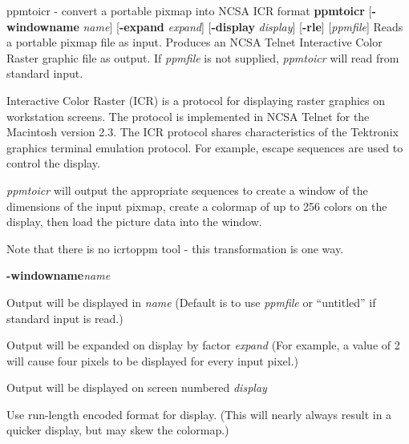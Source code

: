 %

\newpage
%

ppmtoicr - convert a portable pixmap into NCSA ICR format 
{\bf ppmtoicr}
{\rm [}{\bf -windowname}
{\it name}{\rm ]}
{\rm [}{\bf -expand}
{\it expand}{\rm ]}
{\rm [}{\bf -display}
{\it display}{\rm ]}
{\rm [}{\bf -rle}{\rm ]}
{\rm [}{\it ppmfile}{\rm ]}
Reads a portable pixmap file as input.
Produces an NCSA Telnet Interactive Color Raster graphic file as output.
If
{\it ppmfile}
is not supplied, 
{\it ppmtoicr}
will read from standard input.
\par
Interactive Color Raster (ICR) is a protocol for displaying raster
graphics on workstation screens. The protocol is implemented in NCSA
Telnet for the Macintosh version 2.3.
The ICR protocol shares
characteristics of the Tektronix graphics terminal emulation protocol.
For example, escape sequences are used to control the display.
\par
{\it ppmtoicr}
will output the appropriate sequences to create a window of the
dimensions of the input pixmap,
create a colormap of up to 256
colors on the display, then load the picture data into the window.
\par
Note that there is no icrtoppm tool - this transformation is one way.
\begin{TPlist}{{\bf -windowname}{\it name}
}
\item[{{\bf -windowname}{\it name}
}]
Output will be displayed in
{\it name}
(Default is to use
{\it ppmfile}
or ``untitled'' if standard input is read.)
\item[{{\bf -expand}{\it expand}
}]
Output will be expanded on display by factor 
{\it expand}
(For example, a value of 2 will cause four pixels to be displayed for
every input pixel.)
\item[{{\bf -display}{\it display}
}]
Output will be displayed on screen numbered 
{\it display}
\item[{{\bf -rle}}]
Use run-length encoded format for display. (This will nearly always
result in a quicker display, but may skew the colormap.)
\end{TPlist}

